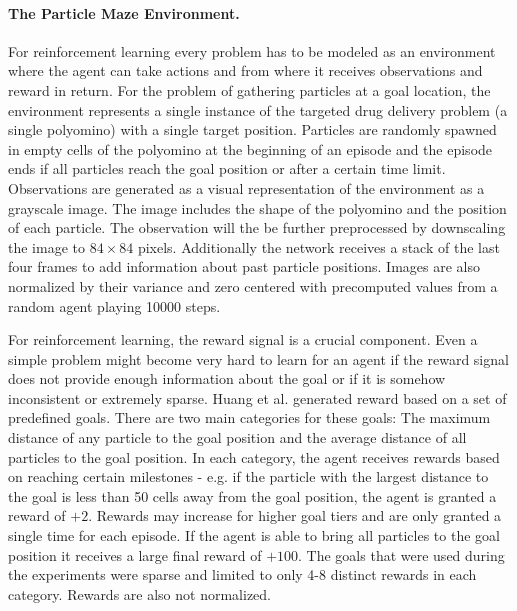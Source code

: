 \paragraph{The Particle Maze Environment.}
For reinforcement learning every problem has to be modeled as an environment where the agent can take actions and from where it receives observations and reward in return. For the problem of gathering particles at a goal location, the environment represents a single instance of the targeted drug delivery problem (a single polyomino) with a single target position. Particles are randomly spawned in empty cells of the polyomino at the beginning of an episode and the episode ends if all particles reach the goal position or after a certain time limit. Observations are generated as a visual representation of the environment as a grayscale image. The image includes the shape of the polyomino and the position of each particle. The observation will the be further preprocessed by downscaling the image to $84 \times 84$ pixels. Additionally the network receives a stack of the last four frames to add information about past particle positions. Images are also normalized by their variance and zero centered with precomputed values from a random agent playing 10000 steps.

For reinforcement learning, the reward signal is a crucial component. Even a simple problem might become very hard to learn for an agent if the reward signal does not provide enough information about the goal or if it is somehow inconsistent or extremely sparse. Huang et al. generated reward based on a set of predefined goals. There are two main categories for these goals: The maximum distance of any particle to the goal position and the average distance of all particles to the goal position. In each category, the agent receives rewards based on reaching certain milestones - e.g. if the particle with the largest distance to the goal is less than 50 cells away from the goal position, the agent is granted a reward of $+2$. Rewards may increase for higher goal tiers and are only granted a single time for each episode. If the agent is able to bring all particles to the goal position it receives a large final reward of $+100$. The goals that were used during the experiments were sparse and limited to only 4-8 distinct rewards in each category. Rewards are also not normalized.

